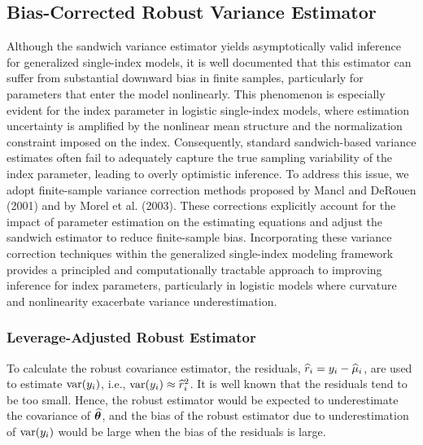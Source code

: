 \subsection{Bias-Corrected Robust Variance Estimator}
Although the sandwich variance estimator yields asymptotically valid inference for generalized single-index models, it is well documented that this estimator can suffer from substantial downward bias in finite samples, particularly for parameters that enter the model nonlinearly. This phenomenon is especially evident for the index parameter in logistic single-index models, where estimation uncertainty is amplified by the nonlinear mean structure and the normalization constraint imposed on the index. Consequently, standard sandwich-based variance estimates often fail to adequately capture the true sampling variability of the index parameter, leading to overly optimistic inference. To address this issue, we adopt finite-sample variance correction methods proposed by Mancl and DeRouen (2001) and by Morel et al. (2003). These corrections explicitly account for the impact of parameter estimation on the estimating equations and adjust the sandwich estimator to reduce finite-sample bias. Incorporating these variance correction techniques within the generalized single-index modeling framework provides a principled and computationally tractable approach to improving inference for index parameters, particularly in logistic models where curvature and nonlinearity exacerbate variance underestimation.


\subsubsection{Leverage-Adjusted Robust Estimator}
To calculate the robust covariance estimator, the residuals, $\widehat r_i = y_i-\widehat\mu_i$, are used to estimate $\text{var}(y_i)$, i.e., $\text{var}(y_i) \approx \widehat r_i^2$.  It is well known that the residuals tend to be too small. Hence, the robust estimator would be expected 	to underestimate the covariance of $\widehat{\bm\theta}$, and the bias of the robust estimator due to underestimation of $\text{var}(y_i)$ would be large when the bias of the residuals is large.


